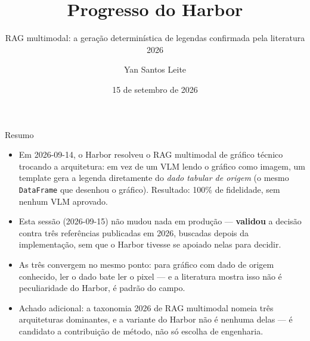 \documentclass{beamer}
\title{Progresso do Harbor}
\subtitle{RAG multimodal: a geração determinística de legendas confirmada pela literatura 2026}
\author{Yan Santos Leite}
\date{15 de setembro de 2026}
\begin{document}
\frame{\titlepage}

\begin{frame}{Resumo}
  \begin{itemize}
    \item Em 2026-09-14, o Harbor resolveu o RAG multimodal de gráfico técnico trocando a
      arquitetura: em vez de um VLM lendo o gráfico como imagem, um template gera a legenda
      diretamente do \emph{dado tabular de origem} (o mesmo \texttt{DataFrame} que desenhou o
      gráfico). Resultado: 100\% de fidelidade, sem nenhum VLM aprovado.
    \item Esta sessão (2026-09-15) não mudou nada em produção — \textbf{validou} a decisão
      contra três referências publicadas em 2026, buscadas depois da implementação, sem que o
      Harbor tivesse se apoiado nelas para decidir.
    \item As três convergem no mesmo ponto: para gráfico com dado de origem conhecido, ler o
      dado bate ler o pixel — e a literatura mostra isso não é peculiaridade do Harbor, é
      padrão do campo.
    \item Achado adicional: a taxonomia 2026 de RAG multimodal nomeia três arquiteturas
      dominantes, e a variante do Harbor não é nenhuma delas — é candidato a contribuição de
      método, não só escolha de engenharia.
  \end{itemize}
\end{frame}
\end{document}
